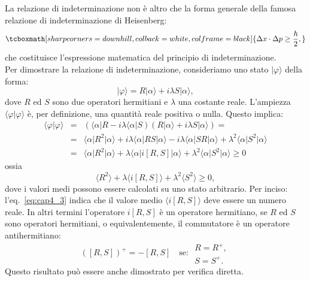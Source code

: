\documentclass[a4paper,12pt,oneside]{book}
\begin{document}
La relazione di indeterminazione non è altro che la forma generale della famosa relazione di indeterminazione di Heisenberg:
	\begin{equation}
		\tcboxmath[sharp corners=downhill, colback=white, colframe=black]{
		\Delta x \cdot \Delta p \geq \frac{\hbar}{2},
		}
	\end{equation}
che costituisce l'espressione matematica del principio di indeterminazione.\\
Per dimostrare la relazione di indeterminazione, consideriamo uno stato $\vert \varphi \rangle$ della forma:
	\begin{equation}
		\vert \varphi \rangle = R\vert \alpha \rangle +i \lambda S \vert \alpha \rangle ,
	\end{equation}
dove $R$ ed $S$ sono due operatori hermitiani e $\lambda $ una costante reale. L'ampiezza $\langle \varphi \vert \varphi \rangle$ è, per definizione, una quantità reale positiva o nulla. Questo implica:
	\begin{eqnarray}
		\langle \varphi \vert \varphi \rangle &=&\left( \langle \alpha \vert R -i \lambda \langle \alpha \vert S \right) \left( R\vert \alpha \rangle +i \lambda S \vert \alpha \rangle  \right) = \nonumber \\
		&=&\langle \alpha \vert R^2 \vert \alpha \rangle + i\lambda \langle \alpha \vert RS \vert \alpha \rangle - i\lambda \langle \alpha \vert SR \vert \alpha \rangle + \lambda ^2 \langle \alpha \vert S^2 \vert \alpha \rangle \nonumber \\
		&=& \langle \alpha \vert R^2 \vert \alpha \rangle + \lambda \langle \alpha \vert i\left[ R,S\right] \vert \alpha \rangle + \lambda ^2 \langle \alpha \vert S^2 \vert \alpha \rangle \geq 0 
\end{eqnarray}
ossia
	\begin{equation}
		\label{eq:cap4_3}
		\langle  R^2  \rangle + \lambda \langle i\left[ R,S \right] \rangle + \lambda ^2 \langle S^2 \rangle \geq 0,
	\end{equation}
dove i valori medi possono essere calcolati su uno stato arbitrario. 
Per inciso: l'eq.~\eqref{eq:cap4_3} indica che il valore medio $\langle i\left[ R,S \right] \rangle$ deve essere un numero reale. In altri termini l'operatore $i\left[R,S	\right]$ è un operatore hermitiano, se $R$ ed $S$ sono operatori hermitiani, o equivalentemente, il commutatore è un operatore antihermitiano:
	\begin{equation}
		\left( \left[R,S \right] \right) ^{+} = - \left[R,S \right] \quad \textrm{se: } \begin{array}{c}
		R=R^{+},\\
		S=S^{+}.
		\end{array}
	\end{equation}
Questo risultato può essere anche dimostrato per verifica diretta.\\ 
\end{document}
